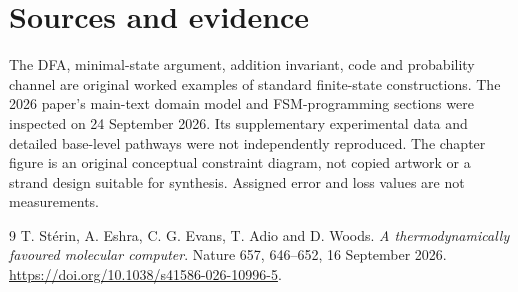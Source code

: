 \section*{Sources and evidence}
The DFA, minimal-state argument, addition invariant, code and probability channel
are original worked examples of standard finite-state constructions.
The 2026 paper's main-text domain model and FSM-programming sections were
inspected on 24 September 2026. Its supplementary experimental data and detailed
base-level pathways were not independently reproduced. The chapter figure is
an original conceptual constraint diagram, not copied artwork or a strand design
suitable for synthesis. Assigned error and loss values are not measurements.
\begingroup\let\chapter\section
\begin{thebibliography}{9}
 T. St\'erin, A. Eshra, C. G. Evans, T. Adio and D. Woods.
\emph{A thermodynamically favoured molecular computer}.
Nature 657, 646--652, 16 September 2026.
\url{https://doi.org/10.1038/s41586-026-10996-5}.
\end{thebibliography}\endgroup
